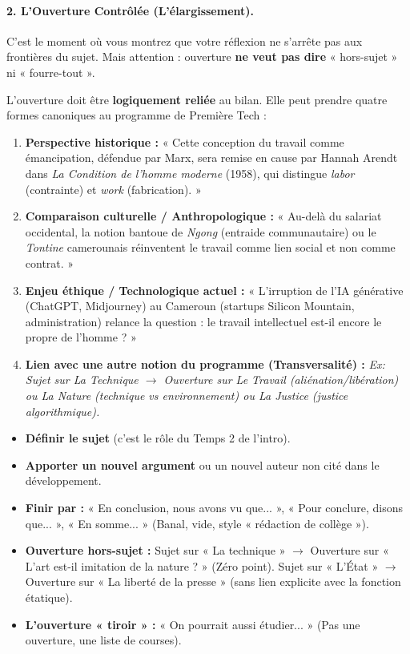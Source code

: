 \documentclass[11pt]{article}
\begin{document}
\paragraph{2. L'Ouverture Contrôlée (L'élargissement).}
C'est le moment où vous montrez que votre réflexion ne s'arrête pas aux frontières du sujet. Mais attention : ouverture \textbf{ne veut pas dire} « hors-sujet » ni « fourre-tout ».

\begin{definition}[Ouverture = Élargissement contrôlé]
L'ouverture doit être \textbf{logiquement reliée} au bilan. Elle peut prendre quatre formes canoniques au programme de Première Tech :
\begin{enumerate}
    \item \textbf{Perspective historique :} « Cette conception du travail comme émancipation, défendue par Marx, sera remise en cause par Hannah Arendt dans \textit{La Condition de l'homme moderne} (1958), qui distingue \textit{labor} (contrainte) et \textit{work} (fabrication). »
    \item \textbf{Comparaison culturelle / Anthropologique :} « Au-delà du salariat occidental, la notion bantoue de \textit{Ngong} (entraide communautaire) ou le \textit{Tontine} camerounais réinventent le travail comme lien social et non comme contrat. »
    \item \textbf{Enjeu éthique / Technologique actuel :} « L'irruption de l'IA générative (ChatGPT, Midjourney) au Cameroun (startups Silicon Mountain, administration) relance la question : le travail intellectuel est-il encore le propre de l'homme ? »
    \item \textbf{Lien avec une autre notion du programme (Transversalité) :} \textit{Ex: Sujet sur La Technique $\to$ Ouverture sur Le Travail (aliénation/libération) ou La Nature (technique vs environnement) ou La Justice (justice algorithmique).}
\end{enumerate}
\end{definition}

\begin{attention}
\begin{itemize}
    \item \textbf{Définir le sujet} (c'est le rôle du Temps 2 de l'intro).
    \item \textbf{Apporter un nouvel argument} ou un nouvel auteur non cité dans le développement.
    \item \textbf{Finir par :} « En conclusion, nous avons vu que... », « Pour conclure, disons que... », « En somme... » (Banal, vide, style « rédaction de collège »).
    \item \textbf{Ouverture hors-sujet :} Sujet sur « La technique » $\to$ Ouverture sur « L'art est-il imitation de la nature ? » (Zéro point). Sujet sur « L'État » $\to$ Ouverture sur « La liberté de la presse » (sans lien explicite avec la fonction étatique).
    \item \textbf{L'ouverture « tiroir » :} « On pourrait aussi étudier... » (Pas une ouverture, une liste de courses).
\end{itemize}
\end{attention}
\end{document}
